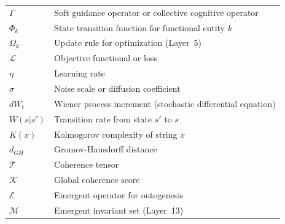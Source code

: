 \begin{longtable}{l p{10cm}}
$\Gamma$ & Soft guidance operator or collective cognitive operator \\
$\Phi_k$ & State transition function for functional entity $k$ \\
$\Omega_k$ & Update rule for optimization (Layer~5) \\
$\mathcal{L}$ & Objective functional or loss \\
$\eta$ & Learning rate \\
$\sigma$ & Noise scale or diffusion coefficient \\
$dW_t$ & Wiener process increment (stochastic differential equation) \\
$W(s|s')$ & Transition rate from state $s'$ to $s$ \\
$K(x)$ & Kolmogorov complexity of string $x$ \\
$d_{GH}$ & Gromov-Hausdorff distance \\
$\mathcal{T}$ & Coherence tensor \\
$\mathcal{K}$ & Global coherence score \\
$\mathcal{E}$ & Emergent operator for ontogenesis \\
$\mathcal{M}$ & Emergent invariant set (Layer~13) \\
\end{longtable}